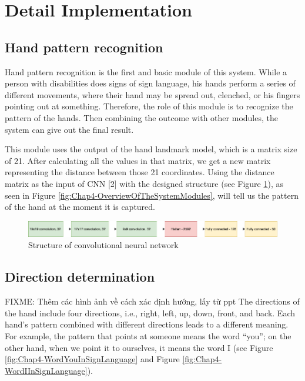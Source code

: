 \section{Detail Implementation}

\subsection{Hand pattern recognition}

Hand pattern recognition is the first and basic module of this system. While a person with disabilities does signs of sign language, his hands perform a series of different movements, where their hand may be spread out, clenched, or his fingers pointing out at something. Therefore, the role of this module is to recognize the pattern of the hands. Then combining the outcome with other modules, the system can give out the final result.

This module uses the output of the hand landmark model, which is a matrix size of 21. After calculating all the values in that matrix, we get a new matrix representing the distance between those 21 coordinates. Using the distance matrix as the input of CNN [2] with the designed structure (see Figure \ref{fig:Chap4-StructureOfConvolutionalNeuralNetwork}), as seen in Figure \ref{fig:Chap4-OverviewOfTheSystemModules}, will tell us the pattern of the hand at the moment it is captured.

\begin{figure}[H]
  \centering
  \includegraphics[width=\textwidth]{img/Chap4/StructureOfConvolutionalNeuralNetwork.png}
  \caption{Structure of convolutional neural network}
  \label{fig:Chap4-StructureOfConvolutionalNeuralNetwork}
\end{figure}

\subsection{Direction determination}
FIXME: Thêm các hình ảnh về cách xác định hướng, lấy từ ppt
The directions of the hand include four directions, i.e., right, left, up, down, front, and back. Each hand’s pattern combined with different directions leads to a different meaning. For example, the pattern that points at someone means the word “you”; on the other hand, when we point it to ourselves, it means the word I (see Figure \ref{fig:Chap4-WordYouInSignLanguage} and Figure \ref{fig:Chap4-WordIInSignLanguage}).

